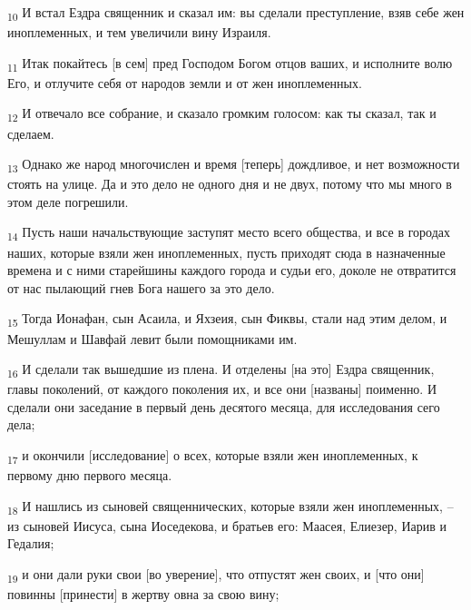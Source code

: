 \begin{tcolorbox}
\textsubscript{10} И встал Ездра священник и сказал им: вы сделали преступление, взяв себе жен иноплеменных, и тем увеличили вину Израиля.
\end{tcolorbox}
\begin{tcolorbox}
\textsubscript{11} Итак покайтесь [в сем] пред Господом Богом отцов ваших, и исполните волю Его, и отлучите себя от народов земли и от жен иноплеменных.
\end{tcolorbox}
\begin{tcolorbox}
\textsubscript{12} И отвечало все собрание, и сказало громким голосом: как ты сказал, так и сделаем.
\end{tcolorbox}
\begin{tcolorbox}
\textsubscript{13} Однако же народ многочислен и время [теперь] дождливое, и нет возможности стоять на улице. Да и это дело не одного дня и не двух, потому что мы много в этом деле погрешили.
\end{tcolorbox}
\begin{tcolorbox}
\textsubscript{14} Пусть наши начальствующие заступят место всего общества, и все в городах наших, которые взяли жен иноплеменных, пусть приходят сюда в назначенные времена и с ними старейшины каждого города и судьи его, доколе не отвратится от нас пылающий гнев Бога нашего за это дело.
\end{tcolorbox}
\begin{tcolorbox}
\textsubscript{15} Тогда Ионафан, сын Асаила, и Яхзеия, сын Фиквы, стали над этим делом, и Мешуллам и Шавфай левит были помощниками им.
\end{tcolorbox}
\begin{tcolorbox}
\textsubscript{16} И сделали так вышедшие из плена. И отделены [на это] Ездра священник, главы поколений, от каждого поколения их, и все они [названы] поименно. И сделали они заседание в первый день десятого месяца, для исследования сего дела;
\end{tcolorbox}
\begin{tcolorbox}
\textsubscript{17} и окончили [исследование] о всех, которые взяли жен иноплеменных, к первому дню первого месяца.
\end{tcolorbox}
\begin{tcolorbox}
\textsubscript{18} И нашлись из сыновей священнических, которые взяли жен иноплеменных, --из сыновей Иисуса, сына Иоседекова, и братьев его: Маасея, Елиезер, Иарив и Гедалия;
\end{tcolorbox}
\begin{tcolorbox}
\textsubscript{19} и они дали руки свои [во уверение], что отпустят жен своих, и [что они] повинны [принести] в жертву овна за свою вину;
\end{tcolorbox}
